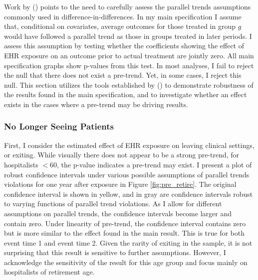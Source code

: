 \documentclass[12pt]{article}
\begin{document}
Work by \citeauthor{rambachan2019honest} (\citeyear{rambachan2019honest}) points to the need to carefully assess the parallel trends assumptions commonly used in difference-in-differences. In my main specification I assume that, conditional on covariates, average outcomes for those treated in group $g$ would have followed a parallel trend as those in groups treated in later periods. I assess this assumption by testing whether the coefficients showing the effect of EHR exposure on an outcome prior to actual treatment are jointly zero. All main specification graphs show p-values from this test. In most analyses, I fail to reject the null that there does not exist a pre-trend. Yet, in some cases, I reject this null. This section utilizes the tools established by \citeauthor{rambachan2019honest} (\citeyear{rambachan2019honest}) to demonstrate robustness of the results found in the main specification, and to investigate whether an effect exists in the cases where a pre-trend may be driving results. 

\subsubsection{No Longer Seeing Patients} 

First, I consider the estimated effect of EHR exposure on leaving clinical settings, or exiting. While visually there does not appear to be a strong pre-trend, for hospitalists $< 60$, the p-value indicates a pre-trend may exist. I present a plot of robust confidence intervals under various possible assumptions of parallel trends violations for one year after exposure in Figure \ref{fig:pre_retire}. The original confidence interval is shown in yellow, and in gray are confidence intervals robust to varying functions of parallel trend violations. As I allow for different assumptions on parallel trends, the confidence intervals become larger and contain zero. Under linearity of pre-trend, the confidence interval contains zero but is more similar to the effect found in the main result. This is true for both event time 1 and event time 2. Given the rarity of exiting in the sample, it is not surprising that this result is sensitive to further assumptions. However, I acknowledge the sensitivity of the result for this age group and focus mainly on hospitalists of retirement age. 
\end{document}
